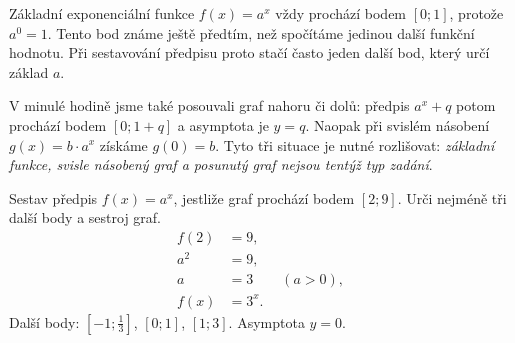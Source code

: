 \documentclass[11pt,a4paper]{article}
\begin{document}
Základní exponenciální funkce $f(x)=a^x$ vždy prochází bodem $[0;1]$, protože $a^0=1$. Tento bod známe ještě předtím, než spočítáme jedinou další funkční hodnotu. Při sestavování předpisu proto stačí často jeden další bod, který určí základ $a$.

V minulé hodině jsme také posouvali graf nahoru či dolů: předpis $a^x+q$ potom prochází bodem $[0;1+q]$ a asymptota je $y=q$. Naopak při svislém násobení $g(x)=b\cdot a^x$ získáme $g(0)=b$. Tyto tři situace je nutné rozlišovat: \emph{základní funkce, svisle násobený graf a posunutý graf nejsou tentýž typ zadání}.
\begin{prikladReseniBox}[title={Příklad 1}]
Sestav předpis $f(x)=a^x$, jestliže graf prochází bodem $[2;9]$. Urči nejméně tři další body a sestroj graf.
\tcblower
\[
\begin{aligned}
f(2)&=9,\\
a^2&=9,\\
a&=3\qquad (a>0),\\
f(x)&=3^x.
\end{aligned}
\]
Další body: $[-1;\frac{1}{3}]$, $[0;1]$, $[1;3]$. Asymptota $y=0$.\begin{center}
\end{center}
\end{prikladReseniBox}
\end{document}
